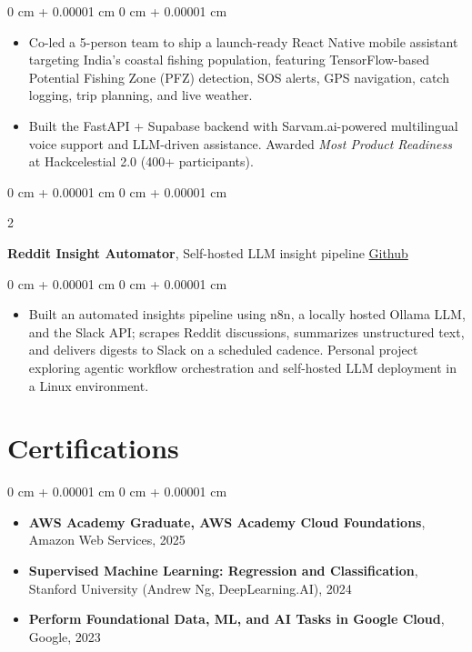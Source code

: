 \documentclass[10pt, letterpaper]{article}
\newenvironment{highlights}{
    \begin{itemize}[
        topsep=0.10 cm,
        parsep=0.10 cm,
        partopsep=0pt,
        itemsep=0pt,
        leftmargin=0 cm + 10pt
    ]
}{
    \end{itemize}
} %
\newenvironment{onecolentry}{
    \begin{adjustwidth}{
        0 cm + 0.00001 cm
    }{
        0 cm + 0.00001 cm
    }
}{
    \end{adjustwidth}
} %
\newenvironment{twocolentry}[2][]{
    \onecolentry
    \def\secondColumn{#2}
    \setcolumnwidth{\fill, 4.5 cm}
    \begin{paracol}{2}
}{
    \switchcolumn \raggedleft \secondColumn
    \end{paracol}
    \endonecolentry
} %
\begin{document}
        \vspace{0.10 cm}
        \begin{onecolentry}
            \begin{highlights}
                \item Co-led a 5-person team to ship a launch-ready React Native mobile assistant targeting India's coastal fishing population, featuring TensorFlow-based Potential Fishing Zone (PFZ) detection, SOS alerts, GPS navigation, catch logging, trip planning, and live weather.
                \item Built the FastAPI + Supabase backend with Sarvam.ai-powered multilingual voice support and LLM-driven assistance. Awarded \textit{Most Product Readiness} at Hackcelestial 2.0 (400+ participants).
            \end{highlights}
        \end{onecolentry}

        \vspace{0.2 cm}

        \begin{twocolentry}{
            \href{https://github.com/vinaypokharkar/Reddit-Insight-Automator}{Github}
        }
            \textbf{Reddit Insight Automator}, Self-hosted LLM insight pipeline \end{twocolentry}

        \vspace{0.10 cm}
        \begin{onecolentry}
            \begin{highlights}
                \item Built an automated insights pipeline using n8n, a locally hosted Ollama LLM, and the Slack API; scrapes Reddit discussions, summarizes unstructured text, and delivers digests to Slack on a scheduled cadence. Personal project exploring agentic workflow orchestration and self-hosted LLM deployment in a Linux environment.
            \end{highlights}
        \end{onecolentry}


    \section{Certifications}
        \begin{onecolentry}
            \begin{itemize}
                \item \textbf{AWS Academy Graduate, AWS Academy Cloud Foundations}, Amazon Web Services, 2025
                \item \textbf{Supervised Machine Learning: Regression and Classification}, Stanford University (Andrew Ng, DeepLearning.AI), 2024
                \item \textbf{Perform Foundational Data, ML, and AI Tasks in Google Cloud}, Google, 2023
            \end{itemize}
        \end{onecolentry}
\end{document}
